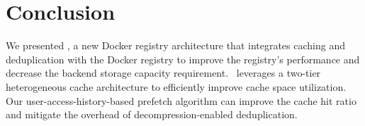 \section{Conclusion}
\label{sec:conclusion}
We presented \sysname, a new Docker registry architecture that integrates caching and deduplication with the Docker registry to
improve the registry's performance and decrease the backend storage capacity requirement. 
\sysname~leverages a two-tier heterogeneous cache architecture to efficiently improve cache space 
utilization. Our user-access-history-based prefetch algorithm can improve the cache hit ratio and mitigate the overhead of decompression-enabled deduplication.
